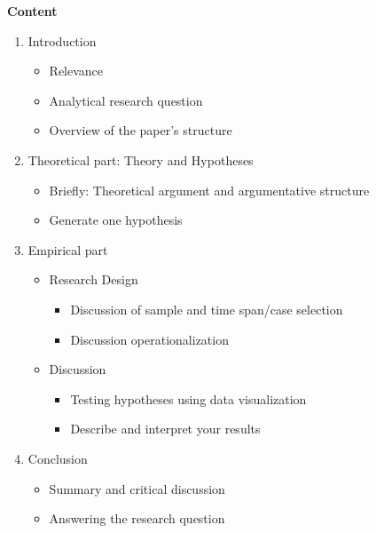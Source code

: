 \documentclass{article}
\begin{document}
\pagebreak
\textbf{Content}

\begin{enumerate}
\item Introduction
\begin{itemize}
\item[-] Relevance
\item[-] Analytical research question
\item[-] Overview of the paper's structure
\end{itemize}
\item Theoretical part: Theory and Hypotheses
\begin{itemize}
\item[-] Briefly: Theoretical argument and argumentative structure
\item[-] Generate one hypothesis
\end{itemize}
\item Empirical part
\begin{itemize}
\item[3.1] Research Design
\begin{itemize}
\item[-] Discussion of sample and time span/case selection
\item[-] Discussion operationalization
\end{itemize}
\item[3.2] Discussion
\begin{itemize}
\item[-] Testing hypotheses using data visualization
\item[-] Describe and interpret your results
\end{itemize}
\end{itemize}

\item Conclusion
\begin{itemize}
\item[-] Summary and critical discussion
\item[-] Answering the research question
\end{itemize}	
\end{enumerate}
\end{document}
